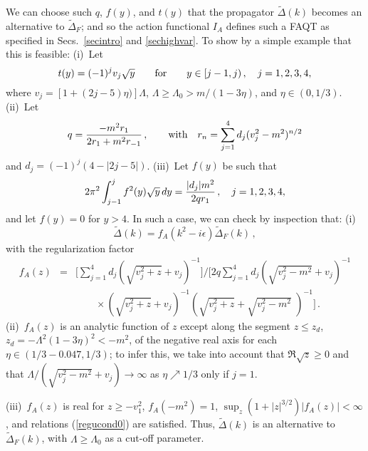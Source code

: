 \documentclass[a4paper,12pt]{article}
\newcommand{\prop}{\widetilde{\Delta}}
\newcommand{\propF}{\prop_F}
\newcommand{\altreg}{f_{A}}
\begin{document}
We can choose such $q$, $f(y)$, and $t(y)$ that the propagator $\prop(k)$ becomes an alternative to $\propF$; and so the action functional $I_A$ defines such a FAQT as specified in Secs.~\ref{secintro} and \ref{sechighvar}. To show by a simple example that this is feasible: (i)~Let 
\begin{equation}
   t(y) = (-1)^j v_j \sqrt{y} \qquad\hbox{for}\qquad y \in [j-1,j) \,, \quad j= 1, 2, 3, 4, 
   \label{examplet}
\end{equation}
where $v_j = [ 1 + (2j - 5)\eta)] \Lambda $, $\Lambda \ge \Lambda_0 > m/(1 - 3\eta)$, and $ \eta \in (0, 1/3)$. (ii)~Let 
\begin{equation}
   q = { - m^2 r_1 \over 2r_1 + m^2 r_{-1} } \,, \qquad \hbox{with}\quad r_n = \sum_{j=1}^4 d_j ( v_j^2 - m^2 )^{n/2} 
   \label{exampleq}
\end{equation}  
and $d_j = (-1)^j (4 - |2j - 5|)$. (iii)~Let $f(y)$ be such that 
\begin{equation}
   2\pi^2 \int_{j-1}^j f^2(y) \sqrt{y} \, dy = { |d_j | m^2 \over 2 q r_1 } \,, \quad j= 1, 2, 3, 4,
   \label{examplef}
\end{equation}
and let $f(y) = 0$ for $y > 4$. In such a case, we can check by inspection that: (i)
\begin{equation}
   \prop(k) = \altreg(k^2 - i\epsilon ) \propF(k)  \,, %
   \label{alternative2}
\end{equation}
with the regularization factor
\begin{eqnarray}
   \altreg(z) & = &   \Big [ \sum_{j=1}^4 d_j ( \sqrt{v_j^2 + z} + v_j )^{-1} \Big ] \Big/ \Big [ 2q \sum_{j=1}^4 d_j ( \sqrt{v_j^2 - m^2} + v_j )^{-1}
         \nonumber \\
                 & &\qquad \times ( \sqrt{v_j^2 + z} + v_j )^{-1} ( \sqrt{v_j^2 + z} + \sqrt{v_j^2 - m^2}\,\, )^{-1} \Big ] \,.
   \label{tranpropexample}
\end{eqnarray}
(ii)~$\altreg(z)$ is an analytic function of $z$ except along the segment $z \le z_d$, $z_d = - \Lambda^2 (1 -3\eta)^2 < -m^2 $, of the negative real axis for each $\eta \in (1/3 - 0.047, 1/3)$; to infer this, we take into account that $\Re \sqrt z \ge 0$ and that $\Lambda/(\sqrt{v_j^2 - m^2} + v_j) \to  \infty$ as $\eta \nearrow 1/3$ only if $j = 1$. 

(iii)~$\altreg(z)$ is real for $z \ge - v_1^2$, $\altreg(-m^2) = 1$, $\sup_z (1 + |z|^{3/2}) |\altreg(z)| < \infty$, and relations (\ref{regucond0}) are satisfied. Thus, $\prop(k)$ is an alternative to $\propF(k)$, with $\Lambda \ge \Lambda_0 $ as a cut-off parameter. 
\end{document}
